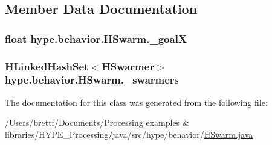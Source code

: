 \subsection{Member Data Documentation}
\hypertarget{classhype_1_1behavior_1_1_h_swarm_a82d5808ca78e66936c20d55b4ae140d4}{
\subsubsection[{\-\_\-goal\-X}]{\setlength{\rightskip}{0pt plus 5cm}float hype.\-behavior.\-H\-Swarm.\-\_\-goal\-X\hspace{0.3cm}{\ttfamily [protected]}}}\label{classhype_1_1behavior_1_1_h_swarm_a82d5808ca78e66936c20d55b4ae140d4}
\hypertarget{classhype_1_1behavior_1_1_h_swarm_a496a11ba4ddf5ff870c5017682d2e5a9}{
\subsubsection[{\-\_\-swarmers}]{\setlength{\rightskip}{0pt plus 5cm}H\-Linked\-Hash\-Set$<${\bf H\-Swarmer}$>$ hype.\-behavior.\-H\-Swarm.\-\_\-swarmers\hspace{0.3cm}{\ttfamily [protected]}}}\label{classhype_1_1behavior_1_1_h_swarm_a496a11ba4ddf5ff870c5017682d2e5a9}


The documentation for this class was generated from the following file\-:\begin{DoxyCompactItemize}
\item 
/\-Users/brettf/\-Documents/\-Processing examples \& libraries/\-H\-Y\-P\-E\-\_\-\-Processing/java/src/hype/behavior/\hyperlink{_h_swarm_8java}{H\-Swarm.\-java}\end{DoxyCompactItemize}
